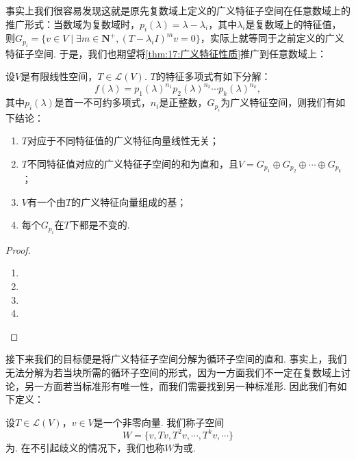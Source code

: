 事实上我们很容易发现这就是原先复数域上定义的广义特征子空间在任意数域上的推广形式：当数域为复数域时，$p_i(\lambda)=\lambda-\lambda_i$，其中$\lambda_i$是复数域上的特征值，则$G_{p_i}=\{v\in V\mid\exists m\in\mathbf{N}^+,(T-\lambda_iI)^mv=0\}$，实际上就等同于之前定义的广义特征子空间. 于是，我们也期望将\autoref{thm:17:广义特征性质}推广到任意数域上：
\begin{theorem} \label{thm:20:推广广义特征性质}
    设$V$是有限线性空间，$T\in \mathcal{L}(V)$. $T$的特征多项式有如下分解：
    \[f(\lambda)=p_1(\lambda)^{n_1}p_2(\lambda)^{n_2}\cdots p_k(\lambda)^{n_k},\]
    其中$p_i(\lambda)$是首一不可约多项式，$n_i$是正整数，$G_{p_i}$为广义特征空间，则我们有如下结论：
    \begin{enumerate}[label=(\arabic*)]
        \item $T$对应于不同特征值的广义特征向量线性无关；
        \item $T$不同特征值对应的广义特征子空间的和为直和，且$V=G_{p_1}\oplus G_{p_2}\oplus\cdots\oplus G_{p_k}$；
        \item $V$有一个由$T$的广义特征向量组成的基；
        \item 每个$G_{p_i}$在$T$下都是不变的.
    \end{enumerate}
\end{theorem}
\begin{proof}
    \begin{enumerate}
        \item
        \item
        \item
        \item
    \end{enumerate}
\end{proof}

接下来我们的目标便是将广义特征子空间分解为循环子空间的直和. 事实上，我们无法分解为若当块所需的循环子空间的形式，因为一方面我们不一定在复数域上讨论，另一方面若当标准形有唯一性，而我们需要找到另一种标准形. 因此我们有如下定义：
\begin{definition}
    设$T\in\mathcal{L}(V)$，$v\in V$是一个非零向量. 我们称子空间
    \[W=\{v,Tv,T^2v,\cdots,T^kv,\cdots\}\]
    为. 在不引起歧义的情况下，我们也称$W$为或.
\end{definition}

